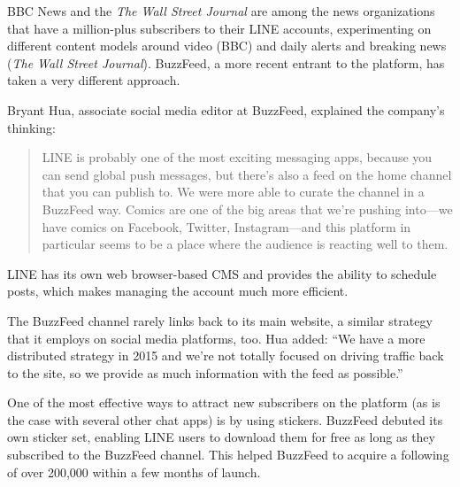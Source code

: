 \documentclass[notoc, symmetric, nobib, nols]{towcenter-guideto-book}
\begin{document}
BBC News and the \textit{The Wall Street Journal} are among the news organizations that have a million-plus subscribers to their LINE accounts, experimenting on different content models around video (BBC) and daily alerts and breaking news (\textit{The Wall Street Journal}). BuzzFeed, a more recent entrant to the platform, has taken a very different approach.

Bryant Hua, associate social media editor at BuzzFeed, explained the company's thinking:

\begin{quote}
LINE is probably one of the most exciting messaging apps, because you can send global push messages, but there's also a feed on the home channel that you can publish to. We were more able to curate the channel in a BuzzFeed way. Comics are one of the big areas that we're pushing into---we have comics on Facebook, Twitter, Instagram---and this platform in particular seems to be a place where the audience is reacting well to them.
\end{quote}




LINE has its own web browser-based CMS and provides the ability to schedule posts, which makes managing the account much more efficient.

The BuzzFeed channel rarely links back to its main website, a similar strategy that it employs on social media platforms, too. Hua added: ``We have a more distributed strategy in 2015 and we're not totally focused on driving traffic back to the site, so we provide as much information with the feed as possible.'' 

One of the most effective ways to attract new subscribers on the platform (as is the case with several other chat apps) is by using stickers. BuzzFeed debuted its own sticker set, enabling LINE users to download them for free as long as they subscribed to the BuzzFeed channel. This helped BuzzFeed to acquire a following of over 200,000 within a few months of launch.
\end{document}
